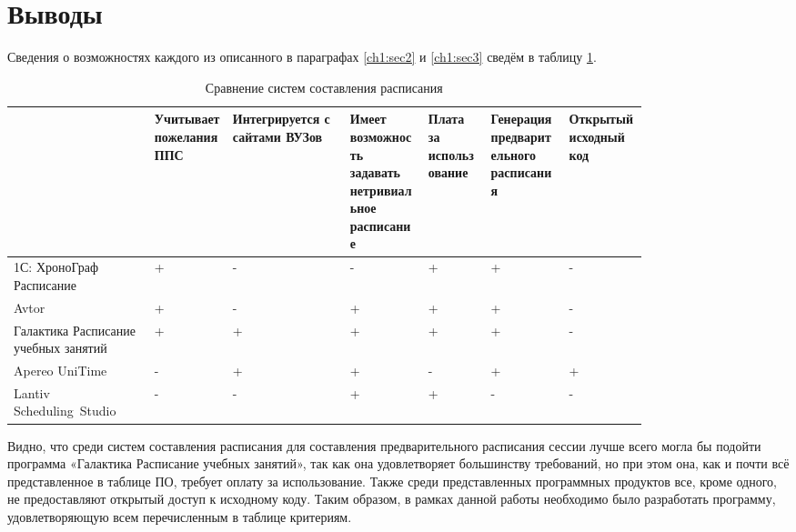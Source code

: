 \section{Выводы} \label{ch1:conclusion}
Сведения о возможностях каждого из описанного в параграфах	\ref{ch1:sec2} и \ref{ch1:sec3} сведём в таблицу \ref{tab:1.4.1}.
\begin{table} [htbp]
	\centering\small
	\caption{Сравнение систем составления расписания}%
	\label{tab:1.4.1}	
	\begin{tabular}{|p{0.18\linewidth}|p{0.1\linewidth}|p{0.15\linewidth}|p{0.1\linewidth}|p{0.08\linewidth}|p{0.1\linewidth}|p{0.1\linewidth}|}
		\hline
		&Учитывает пожелания ППС&Интегрируется с сайтами ВУЗов&Имеет возможность задавать нетривиальное расписание&Плата за использование&Генерация предварительного расписания&Открытый исходный код\\
		\hline
		1С: ХроноГраф Расписание&+&-&-&+&+&-\\ \hline
		Avtor&+&-&+&+&+&-\\ \hline
		Галактика Расписание учебных занятий&+&+&+&+&+&-\\ \hline
		Apereo UniTime&-&+&+&-&+&+\\ \hline
		Lantiv Scheduling Studio&-&-&+&+&-&-\\ \hline	
	\end{tabular}
\end{table}

Видно, что среди систем составления расписания для составления предварительного расписания сессии лучше всего могла бы подойти программа «Галактика Расписание учебных занятий», так как она удовлетворяет большинству требований, но при этом она, как и почти всё представленное в таблице ПО, требует оплату за использование. Также среди представленных программных продуктов все, кроме одного, не предоставляют открытый доступ к исходному коду. 
Таким образом, в рамках данной работы необходимо было разработать программу, удовлетворяющую всем перечисленным в таблице критериям.
